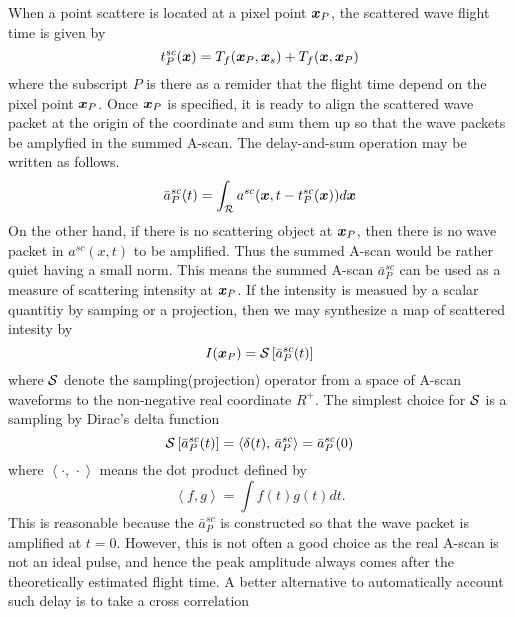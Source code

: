 ﻿\documentclass[11pt,a4j]{article}
\begin{document}
When a point scattere is located at a pixel point $\mbox{\boldmath $x$}_P$, the scattered wave flight time  
 is given by 
\begin{equation}
	t_P^{sc}(\mbox{\boldmath $x$})=
	T_f(\mbox{\boldmath $x$}_P,\mbox{\boldmath $x$}_s)
	+
	T_f(\mbox{\boldmath $x$},\mbox{\boldmath $x$}_P)
	\label{eqn:}
\end{equation}
where the subscript $P$ is there as a remider that the flight time depend on the pixel point $\mbox{\boldmath $x$}_P$.
Once $\mbox{\boldmath $x$}_P$ is specified, it is ready to align the scattered wave packet at 
the origin of the coordinate and sum them up so that the wave packets be amplyfied in the 
summed A-scan. The delay-and-sum operation may be written as follows. 
\begin{equation}
	\bar{a}^{sc}_P(t)=\int _{\cal R} a^{sc}(\mbox{\boldmath $x$},t-t^{sc}_P(\mbox{\boldmath $x$}))d\mbox{\boldmath $x$}
	\label{eqn:asum_sc}
\end{equation}
On the other hand, if there is no scattering object at $\mbox{\boldmath $x$}_P$, then there is no wave packet in $a^{sc}(x,t)$ 
to be amplified. Thus the summed A-scan would be rather quiet having a small norm.
This means the summed A-scan $\bar a^{sc}_P$ can be used as a measure of scattering intensity at $\mbox{\boldmath $x$}_P$. 
If the intensity is measued by a scalar quantitiy by samping or a projection, then we may synthesize a 
map of scattered intesity by 
\begin{equation}
	I(\mbox{\boldmath $x$}_P)={\cal S} \left[ \bar{a}^{sc}_P(t) \right]
	\label{eqn:}
\end{equation}
where ${\cal S}$ denote the sampling(projection) operator from a space of 
 A-scan waveforms to the non-negative real coordinate $R^{+}$.
 The simplest choice for $\cal S$ is a sampling by Dirac's delta function 
\begin{equation}
	{\cal S} \left[ 
		\bar{a}^{sc}_P(t) 
		\right]
	=\left<
	\delta(t),\, \bar{a}^{sc}_P
	\right>
	=
	\bar{a}^{sc}_P(0)
\end{equation}
where $\left<\cdot,\, \cdot \right>$ means the dot product defined by 
\begin{equation}
	\left< f,g \right>=\int f(t)g(t) dt.
	\label{eqn:}
\end{equation}
This is reasonable because the $\bar{a}^{sc}_P$ is constructed so that the 
wave packet is amplified at $t=0$. However, this is not often a good choice 
as the real A-scan is not an ideal pulse, and hence the peak amplitude 
always comes after the theoretically estimated flight time. 
A better alternative to automatically account such delay is to take a cross correlation 
\end{document}
